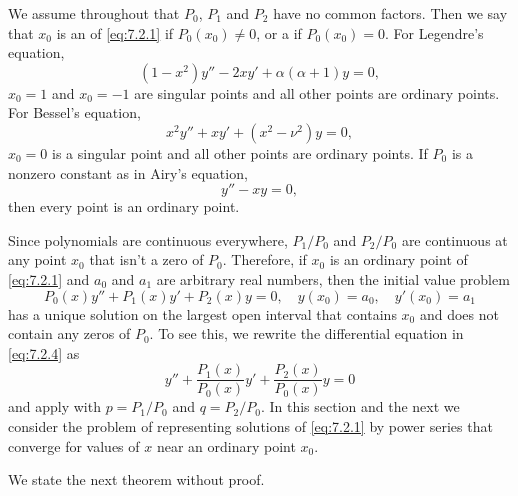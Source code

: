 We assume throughout that $P_0$, $P_1$ and $P_2$ have no common
factors. Then we say that $x_0$ is an  of
\eqref{eq:7.2.1} if $P_0(x_0)\ne0$, or a  if
$P_0(x_0)=0$. For Legendre's equation,
\begin{equation}\label{eq:7.2.2}
(1-x^2)y''-2xy'+\alpha(\alpha+1)y=0,
\end{equation}
$x_0=1$ and $x_0=-1$ are singular points and all other points are
ordinary points. For Bessel's equation,
\[
x^2y''+xy'+(x^2-\nu^2)y=0,
\]
$x_0=0$ is a singular point and all other points are ordinary points.
If $P_0$ is a nonzero constant as in Airy's
equation,
\begin{equation}\label{eq:7.2.3}
y''-xy=0,
\end{equation}
then every point is an ordinary point.

Since polynomials are continuous everywhere, $P_1/P_0$ and $P_2/P_0$
are continuous at any point $x_0$ that isn't  a zero of $P_0$.
Therefore, if $x_0$ is an ordinary point of \eqref{eq:7.2.1} and $a_0$ and
$a_1$ are arbitrary real numbers, then the initial value problem
\begin{equation}\label{eq:7.2.4}
P_0(x)y''+P_1(x)y'+P_2(x)y=0, \quad  y(x_0)=a_0,\quad y'(x_0)=a_1
\end{equation}
has a unique solution on the largest open interval that contains $x_0$
and does not contain any zeros of $P_0$. To see this, we rewrite the
differential equation in \eqref{eq:7.2.4} as
\[
y''+\frac{P_1(x)}{P_0(x)}y'+\frac{P_2(x)}{P_0(x)}y=0
\]
and apply  with $p=P_1/P_0$ and $q=P_2/P_0$.
In this section and the next we  consider the problem of
representing  solutions of \eqref{eq:7.2.1}  by power series that
converge  for values of $x$  near an ordinary point $x_0$.

We state the next theorem without proof.

